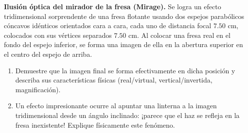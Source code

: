 \item \textbf{Ilusión óptica del mirador de la fresa (Mirage).}
Se logra un efecto tridimensional sorprendente de una fresa flotante usando dos espejos parabólicos cóncavos idénticos orientados cara a cara, cada uno de distancia focal $7.50\text{ cm}$, colocados con sus vértices separados $7.50\text{ cm}$. Al colocar una fresa real en el fondo del espejo inferior, se forma una imagen de ella en la abertura superior en el centro del espejo de arriba.
\begin{enumerate}
    \item Demuestre que la imagen final se forma efectivamente en dicha posición y describa sus características físicas (real/virtual, vertical/invertida, magnificación).
    \item Un efecto impresionante ocurre al apuntar una linterna a la imagen tridimensional desde un ángulo inclinado: ¡parece que el haz se refleja en la fresa inexistente! Explique físicamente este fenómeno.
\end{enumerate}